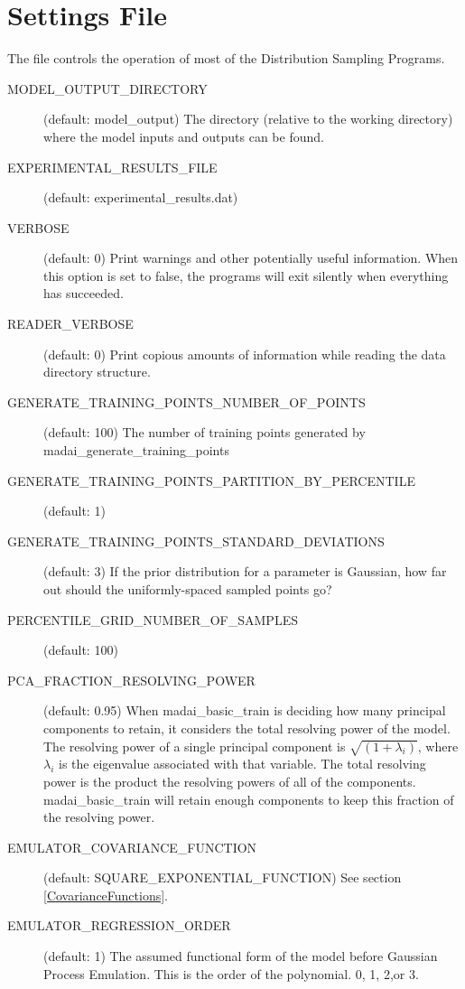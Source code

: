 
\section{Settings File}\label{settings}

The file  controls the operation of most of the
Distribution Sampling Programs.

\begin{description}
    \item[MODEL\_OUTPUT\_DIRECTORY] (default: model\_output) The directory (relative to the working directory) where the model inputs and outputs can be found.
    \item[EXPERIMENTAL\_RESULTS\_FILE] (default: experimental\_results.dat)
    \item[VERBOSE] (default: 0) Print warnings and other potentially useful information. When this option is set to false, the programs will exit silently when everything has succeeded.
    \item[READER\_VERBOSE] (default: 0) Print copious amounts of information while reading the data directory structure.
    \item[GENERATE\_TRAINING\_POINTS\_NUMBER\_OF\_POINTS] (default: 100) The number of training points generated by madai\_generate\_training\_points
    \item[GENERATE\_TRAINING\_POINTS\_PARTITION\_BY\_PERCENTILE] (default: 1)
    \item[GENERATE\_TRAINING\_POINTS\_STANDARD\_DEVIATIONS] (default: 3) If the prior distribution for a parameter is Gaussian, how far out should the uniformly-spaced sampled points go?
    \item[PERCENTILE\_GRID\_NUMBER\_OF\_SAMPLES] (default: 100)
    \item[PCA\_FRACTION\_RESOLVING\_POWER] (default: 0.95)  When madai\_basic\_train is deciding how many principal components to retain, it considers the total resolving power of the model. The resolving power of a single principal component is $\sqrt{(1 + \lambda_i)}$, where $\lambda_i$ is the eigenvalue associated with that variable. The total resolving power is the product the resolving powers of all of the components. madai\_basic\_train will retain enough components to keep this fraction of the resolving power.
    \item[EMULATOR\_COVARIANCE\_FUNCTION] (default: SQUARE\_EXPONENTIAL\_FUNCTION) See section \ref{CovarianceFunctions}.
    \item[EMULATOR\_REGRESSION\_ORDER] (default: 1) The assumed functional form of the model before Gaussian Process Emulation. This is the order of the polynomial. 0, 1, 2,or 3.

\end{description}
